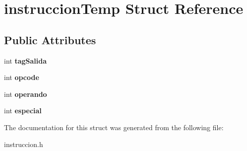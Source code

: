 \hypertarget{structinstruccionTemp}{}\section{instruccion\+Temp Struct Reference}
\label{structinstruccionTemp}
\subsection*{Public Attributes}
\begin{DoxyCompactItemize}
\item 
\hypertarget{structinstruccionTemp_ac07fb0441d025a635f4978b82b4cde3a}{}int {\bfseries tag\+Salida}\label{structinstruccionTemp_ac07fb0441d025a635f4978b82b4cde3a}

\item 
\hypertarget{structinstruccionTemp_a5d70b39120a7ee57267094a7ab811f8a}{}int {\bfseries opcode}\label{structinstruccionTemp_a5d70b39120a7ee57267094a7ab811f8a}

\item 
\hypertarget{structinstruccionTemp_a490ceeac8fcfdde45338e71e56aeead5}{}int {\bfseries operando}\label{structinstruccionTemp_a490ceeac8fcfdde45338e71e56aeead5}

\item 
\hypertarget{structinstruccionTemp_a59573564cf9b9339cbea83c64474e2e2}{}int {\bfseries especial}\label{structinstruccionTemp_a59573564cf9b9339cbea83c64474e2e2}

\end{DoxyCompactItemize}


The documentation for this struct was generated from the following file\+:\begin{DoxyCompactItemize}
\item 
instruccion.\+h\end{DoxyCompactItemize}
